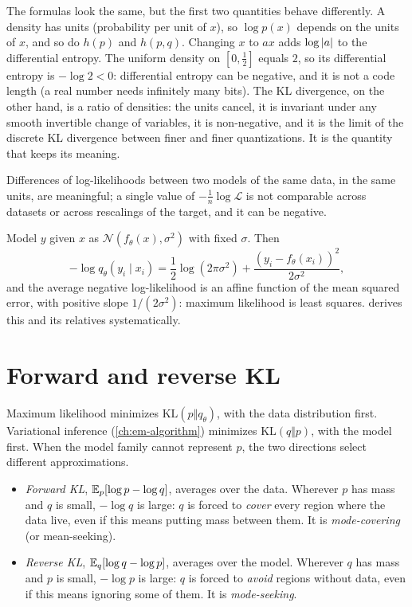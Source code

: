 \begin{notechapter}
The formulas look the same, but the first two quantities behave differently.
A density has units (probability per unit of $x$), so $\log p(x)$ depends on the
units of $x$, and so do $h(p)$ and $h(p,q)$. Changing $x$ to $ax$ adds $\log\left|a\right|$ to
the differential entropy. The uniform density on $[0, \frac12]$ equals $2$, so its
differential entropy is $-\log2<0$: differential entropy can be negative, and it is
not a code length (a real number needs infinitely many bits). The KL divergence,
on the other hand, is a ratio of densities: the units cancel, it is invariant
under any smooth invertible change of variables, it is non-negative, and it is the
limit of the discrete KL divergence between finer and finer quantizations. It is
the quantity that keeps its meaning.

\begin{pitfall}
Differences of log-likelihoods between two models of the same data, in the same
units, are meaningful; a single value of $-\frac1n\log\mathcal L$ is not comparable
across datasets or across rescalings of the target, and it can be negative.
\end{pitfall}

\begin{example}\label{cross-entropy:ex:gaussian}
Model $y$ given $x$ as $\mathcal N(f_\theta(x), \sigma^2)$ with fixed $\sigma$. Then
\[
  -\log q_\theta(y_i\mid x_i) = \frac12\log(2\pi\sigma^2) + \frac{(y_i - f_\theta(x_i))^2}{2\sigma^2},
\]
and the average negative log-likelihood is an affine function of the mean squared
error, with positive slope $1/(2\sigma^2)$: maximum likelihood is least squares.
 derives this and its relatives systematically.
\end{example}

\section{Forward and reverse KL}\label{cross-entropy:sec:forward-reverse}

Maximum likelihood minimizes $\mathrm{KL}(p\Vert q_\theta)$, with the data distribution first.
Variational inference (\cref{ch:em-algorithm}) minimizes $\mathrm{KL}(q\Vert p)$, with the model
first. When the model family cannot represent $p$, the two directions select
different approximations.
\begin{itemize}[nosep]
  \item \emph{Forward KL}, $\mathbb{E}_p[\log p - \log q]$, averages over the data. Wherever $p$ has mass
        and $q$ is small, $-\log q$ is large: $q$ is forced to \emph{cover} every region where
        the data live, even if this means putting mass between them. It is
        \emph{mode-covering} (or mean-seeking).
  \item \emph{Reverse KL}, $\mathbb{E}_q[\log q - \log p]$, averages over the model. Wherever $q$ has mass
        and $p$ is small, $-\log p$ is large: $q$ is forced to \emph{avoid} regions without data,
        even if this means ignoring some of them. It is \emph{mode-seeking}.
\end{itemize}


\end{notechapter}
